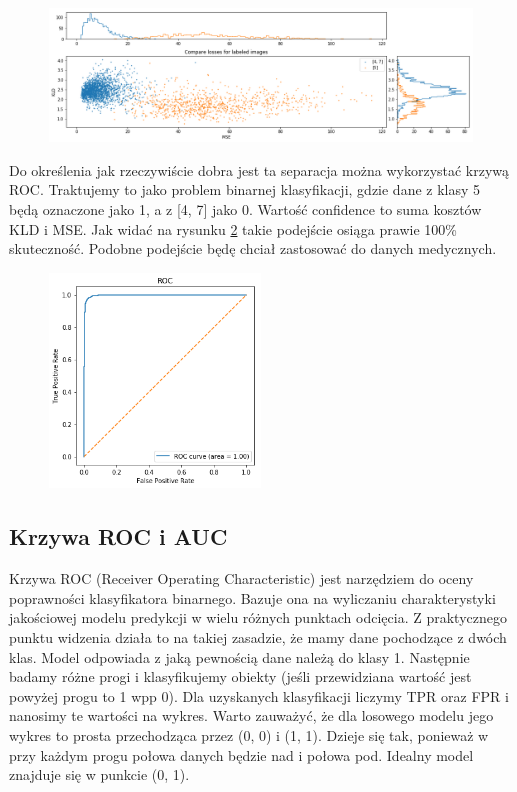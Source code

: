 \begin{figure}[h!]
    \centering
    \includegraphics[width=1.0\textwidth]{images/mnist_compare}
    \caption{}
    \label{fig:mnist_compare}
\end{figure}

Do określenia jak rzeczywiście dobra jest ta separacja można wykorzystać krzywą ROC. Traktujemy to jako problem binarnej klasyfikacji, gdzie dane z klasy 5 będą oznaczone jako 1, a z [4, 7] jako 0. Wartość confidence to suma kosztów KLD i MSE. Jak widać na rysunku \ref{fig:mnist_roc} takie podejście osiąga prawie 100\% skuteczność. Podobne podejście będę chciał zastosować do danych medycznych.

\begin{figure}[h!]
    \centering
    \includegraphics[width=0.5\textwidth]{images/mnist_roc}
    \caption{}
    \label{fig:mnist_roc}
\end{figure}

\subsection{Krzywa ROC i AUC}

Krzywa ROC (Receiver Operating Characteristic) jest narzędziem do oceny poprawności klasyfikatora binarnego. Bazuje ona na wyliczaniu charakterystyki jakościowej modelu predykcji w wielu różnych punktach odcięcia. Z praktycznego punktu widzenia działa to na takiej zasadzie, że mamy dane pochodzące z dwóch klas. Model odpowiada z jaką pewnością dane należą do klasy 1. Następnie badamy różne progi i klasyfikujemy obiekty (jeśli przewidziana wartość jest powyżej progu to 1 wpp 0). Dla uzyskanych klasyfikacji liczymy TPR oraz FPR i nanosimy te wartości na wykres. Warto zauważyć, że dla losowego modelu jego wykres to prosta przechodząca przez (0, 0) i (1, 1). Dzieje się tak, ponieważ w przy każdym progu połowa danych będzie nad i połowa pod. Idealny model znajduje się w punkcie (0, 1).

